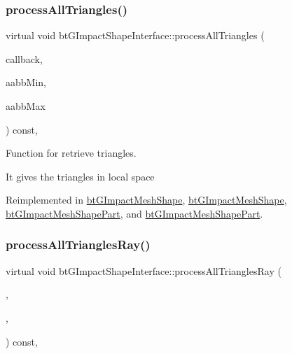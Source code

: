 \subsubsection{\texorpdfstring{process\+All\+Triangles()}{processAllTriangles()}\hspace{0.1cm}{\footnotesize\ttfamily [2/2]}}
{\footnotesize\ttfamily virtual void bt\+G\+Impact\+Shape\+Interface\+::process\+All\+Triangles (\begin{DoxyParamCaption}\item[{\hyperlink{classbtTriangleCallback}{bt\+Triangle\+Callback} $\ast$}]{callback,  }\item[{const bt\+Vector3 \&}]{aabb\+Min,  }\item[{const bt\+Vector3 \&}]{aabb\+Max }\end{DoxyParamCaption}) const\hspace{0.3cm}{\ttfamily [inline]}, {\ttfamily [virtual]}}



Function for retrieve triangles. 

It gives the triangles in local space 

Reimplemented in \hyperlink{classbtGImpactMeshShape_aa2963b35e88c0f423b4b7b10540a5f6b}{bt\+G\+Impact\+Mesh\+Shape}, \hyperlink{classbtGImpactMeshShape_aee93cb18d43817c183fa662d9e7b32e5}{bt\+G\+Impact\+Mesh\+Shape}, \hyperlink{classbtGImpactMeshShapePart_a040a65abd0627d83ecd8bb73be43383e}{bt\+G\+Impact\+Mesh\+Shape\+Part}, and \hyperlink{classbtGImpactMeshShapePart_a85befbcefc4db8ce35db58dc1965d512}{bt\+G\+Impact\+Mesh\+Shape\+Part}.

\mbox{\label{classbtGImpactShapeInterface_af67273183582c6696169ee4ae5d6cf37}} 
\subsubsection{\texorpdfstring{process\+All\+Triangles\+Ray()}{processAllTrianglesRay()}\hspace{0.1cm}{\footnotesize\ttfamily [1/2]}}
{\footnotesize\ttfamily virtual void bt\+G\+Impact\+Shape\+Interface\+::process\+All\+Triangles\+Ray (\begin{DoxyParamCaption}\item[{\hyperlink{classbtTriangleCallback}{bt\+Triangle\+Callback} $\ast$}]{,  }\item[{const bt\+Vector3 \&}]{,  }\item[{const bt\+Vector3 \&}]{ }\end{DoxyParamCaption}) const\hspace{0.3cm}{\ttfamily [inline]}, {\ttfamily [virtual]}}



